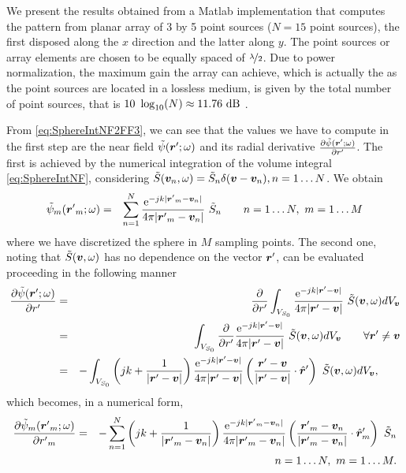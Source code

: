 \par We present the results obtained from a Matlab implementation that computes the pattern from planar array of 3 by 5 point sources ($N = 15$ point sources), the first disposed along the $x$ direction and the latter along $y$. The point sources or array elements are chosen to be equally spaced of $\nicefrac{\lambda}{2}$. Due to power normalization, the maximum gain the array can achieve, which is actually the  as the point sources are located in a lossless medium, is given by the total number of point sources, that is $10 \ \log_{10}(N) \approx 11.76 \ \mathrm{dB}$ \cite{SelleriETA}.

\par From \eqref{eq:SphereIntNF2FF3}, we can see that the values we have to compute in the first step are the near field $ \tilde{\psi}(\mbfit{r'}; \omega) $ and its radial derivative $\frac{\partial{\tilde{\psi}(\mbfit{r'}; \omega)}}{\partial{r'}}$. The first is achieved by the numerical integration of the volume integral \eqref{eq:SphereIntNF}, considering $\tilde{S}(\mbfit{v}_n, \omega) = \tilde{S}_n \delta(\mbfit{v} - \mbfit{v}_n), n=1 \ldots N$. We obtain
\begin{eqnarray}
\label{eq:sphNumPsi}
\tilde{\psi}_m(\mbfit{r'}_m; \omega) & = & \sum_{n=1}^N \frac{\mrm{e}^{-jk|\mbfit{r'}_m-\mbfit{v}_n|}}{4\pi|\mbfit{r'}_m-\mbfit{v}_n|} \ \tilde{S}_n \qquad n=1 \ldots N, \ m=1 \ldots M
\end{eqnarray}
where we have discretized the sphere in $M$ sampling points. The second one, noting that $\tilde{S}(\mbfit{v}, \omega)$ has no dependence on the vector $\mbfit{r'}$, can be evaluated proceeding in the following manner
\begin{eqnarray}
\frac{\partial{\tilde{\psi}(\mbfit{r'}; \omega)}}{\partial{r'}} &= & \frac{\partial{}}{\partial{r'}} \int_{V_{S_0}} \frac{\mrm{e}^{-jk|\mbfit{r'}-\mbfit{v}|}}{4\pi|\mbfit{r'}-\mbfit{v}|} \ \tilde{S}(\mbfit{v}, \omega) d{V}_\mbfit{v} \nonumber \\
& = & \int_{V_{S_0}} \frac{\partial{}}{\partial{r'}} \frac{\mrm{e}^{-jk|\mbfit{r'}-\mbfit{v}|}}{4\pi|\mbfit{r'}-\mbfit{v}|} \ \tilde{S}(\mbfit{v}, \omega) d{V}_\mbfit{v} \qquad \forall \mbfit{r'} \neq \mbfit{v} \nonumber \\
& = & - \int_{V_{S_0}} \left ( jk + \frac{1}{|\mbfit{r'}-\mbfit{v}|} \right )  \frac{\mrm{e}^{-jk|\mbfit{r'}-\mbfit{v}|}}{4\pi|\mbfit{r'}-\mbfit{v}|} \left ( \frac{\mbfit{r'}-\mbfit{v}}{|\mbfit{r'}-\mbfit{v}|} \cdot \hat{\mbfit{r}}' \right ) \ \tilde{S}(\mbfit{v}, \omega) d{V}_\mbfit{v}, \qquad
\end{eqnarray} which becomes, in a numerical form,
\begin{eqnarray}
\frac{\partial{\tilde{\psi}_m(\mbfit{r'}_m; \omega)}}{\partial{r'}_m} & = & - \sum_{n=1}^N \left ( jk + \frac{1}{|\mbfit{r'}_m-\mbfit{v}_n|} \right )  \frac{\mrm{e}^{-jk|\mbfit{r'}_m-\mbfit{v}_n|}}{4\pi|\mbfit{r'}_m-\mbfit{v}_n|} \left ( \frac{\mbfit{r'}_m-\mbfit{v}_n}{|\mbfit{r'}_m-\mbfit{v}_n|} \cdot \hat{\mbfit{r}}'_m \right ) \ \tilde{S}_n \nonumber \\
& & \qquad n=1 \ldots N, \ m=1 \ldots M.
\end{eqnarray}

